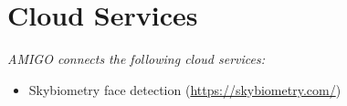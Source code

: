 \section*{Cloud Services}

\textit{AMIGO connects the following cloud services:}
\begin{itemize}
   \item Skybiometry face detection (\url{https://skybiometry.com/})
\end{itemize} 